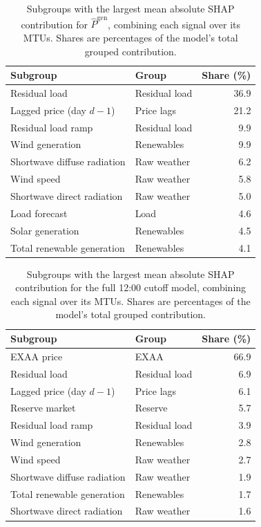 \begin{table}[H]
  \centering
  \small
  \caption[Leading feature contributions in the RQ2 price model.]
  {Subgroups with the largest mean absolute SHAP contribution for \(\hat{P}^{\mathrm{gen}}\), combining each signal
  over its MTUs.
  Shares are percentages of the model's total grouped contribution.}
  \label{tab:rq2_top_features}
  \begin{tabular}{@{}llr@{}}
    \toprule
    Subgroup & Group & Share (\%) \\
    \midrule
    Residual load & Residual load & 36.9 \\
    Lagged price (day \(d-1\)) & Price lags & 21.2 \\
    Residual load ramp & Residual load & 9.9 \\
    Wind generation & Renewables & 9.9 \\
    Shortwave diffuse radiation & Raw weather & 6.2 \\
    Wind speed & Raw weather & 5.8 \\
    Shortwave direct radiation & Raw weather & 5.0 \\
    Load forecast & Load & 4.6 \\
    Solar generation & Renewables & 4.5 \\
    Total renewable generation & Renewables & 4.1 \\
    \bottomrule
  \end{tabular}
\end{table}

\begin{table}[H]
  \centering
  \small
  \caption[Leading feature contributions in the 12:00 cutoff model.]
  {Subgroups with the largest mean absolute SHAP contribution for the
  full 12:00 cutoff model, combining each signal over its MTUs.
  Shares are percentages of the model's total grouped contribution.}
  \label{tab:rq3_top_features}
  \begin{tabular}{@{}llr@{}}
    \toprule
    Subgroup & Group & Share (\%) \\
    \midrule
    EXAA price & EXAA & 66.9 \\
    Residual load & Residual load & 6.9 \\
    Lagged price (day \(d-1\)) & Price lags & 6.1 \\
    Reserve market & Reserve & 5.7 \\
    Residual load ramp & Residual load & 3.9 \\
    Wind generation & Renewables & 2.8 \\
    Wind speed & Raw weather & 2.7 \\
    Shortwave diffuse radiation & Raw weather & 1.9 \\
    Total renewable generation & Renewables & 1.7 \\
    Shortwave direct radiation & Raw weather & 1.6 \\
    \bottomrule
  \end{tabular}
\end{table}

